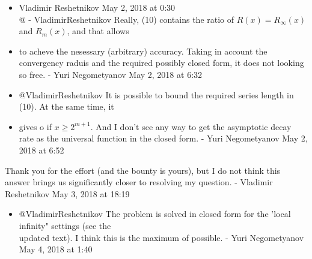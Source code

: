 \documentclass[10pt]{article}
\begin{document}
\begin{itemize}
  \item Vladimir Reshetnikov May 2, 2018 at 0:30\\
@ - VladimirReshetnikov Really, (10) contains the ratio of $R(x)=R_{\infty}(x)$ and $R_{m}(x)$, and that allows
  \item to acheve the nesessary (arbitrary) accuracy. Taking in account the convergency raduis and the required possibly closed form, it does not looking so free. - Yuri Negometyanov May 2, 2018 at 6:32
  \item @VladimirReshetnikov It is possible to bound the required series length in (10). At the same time, it
  \item gives o if $x \geq 2^{m+1}$. And I don't see any way to get the asymptotic decay rate as the universal function in the closed form. - Yuri Negometyanov May 2, 2018 at 6:52
\end{itemize}

Thank you for the effort (and the bounty is yours), but I do not think this answer brings us significantly closer to resolving my question. - Vladimir Reshetnikov May 3, 2018 at 18:19

\begin{itemize}
  \item @VladimirReshetnikov The problem is solved in closed form for the 'local infinity" settings (see the\\
updated text). I think this is the maximum of possible. - Yuri Negometyanov May 4, 2018 at 1:40
\end{itemize}
\end{document}
